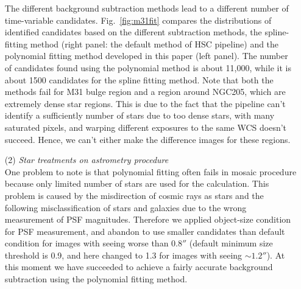 \documentclass[iop, apj]{emulateapj}
\newcommand{\?}{\stackrel{?}{=}}
\begin{document}
\begin{itemize}
%
The different background subtraction methods lead to a different number of time-variable candidates. 
Fig.~\ref{fig:m31fit} compares the distributions of identified candidates based on the different subtraction methods, the spline-fitting method (right panel: the default method of HSC pipeline) and the polynomial fitting method developed in this paper (left panel). 
The number of candidates found using the polynomial method is about 11,000, while it is about 1500 candidates for the spline fitting method. 
Note that both the methods fail for M31 bulge region and a region around NGC205, which are extremely dense star regions. This is due to the fact that the pipeline can't identify a sufficiently number of stars due to too dense stars, with many saturated pixels, and warping different exposures to the same WCS doesn't succeed. Hence, we can't either make the difference images for these regions. 
%
%
%
\item[(2)]{\it Star treatments on astrometry procedure}\\
%
One problem to note is that polynomial fitting often fails in mosaic procedure because 
only limited number of stars are used for the calculation. 
This problem is caused by the misdirection of cosmic rays as stars and the following misclassification of stars and galaxies due to the wrong measurement of PSF magnitudes. 
Therefore we applied object-size condition for PSF measurement, and abandon to use smaller candidates than default condition for images with seeing worse than $0.8''$ (default minimum size threshold is 0.9, and here changed to 1.3 for images with seeing $\sim1.2''$). 
At this moment we have succeeded to achieve a fairly accurate background subtraction using the polynomial fitting method. %


\end{itemize}
\end{document}
